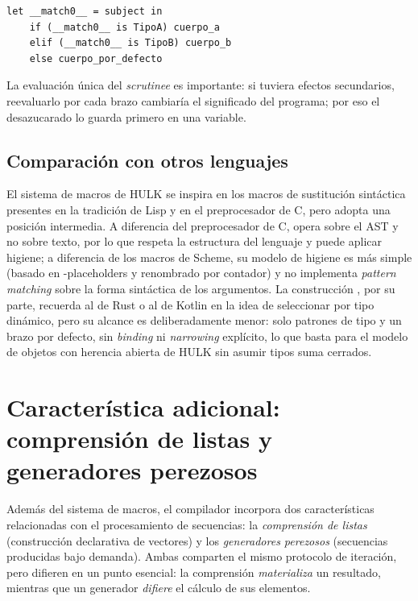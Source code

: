 \documentclass[12pt,letterpaper]{article}
\newcommand{\repo}[1]{\texttt{\detokenize{#1}}}
\newcommand{\hulk}{\textsc{HULK}}
\begin{document}
\begin{lstlisting}[language=HULK,caption={Esquema conceptual de desazucarado de match}]
let __match0__ = subject in
    if (__match0__ is TipoA) cuerpo_a
    elif (__match0__ is TipoB) cuerpo_b
    else cuerpo_por_defecto
\end{lstlisting}

La evaluación única del \emph{scrutinee} es importante: si tuviera efectos
secundarios, reevaluarlo por cada brazo cambiaría el significado del programa; por
eso el desazucarado lo guarda primero en una variable.

\subsection{Comparación con otros lenguajes}

El sistema de macros de \hulk{} se inspira en los macros de sustitución sintáctica
presentes en la tradición de Lisp y en el preprocesador de C, pero adopta una
posición intermedia. A diferencia del preprocesador de C, opera sobre el AST y no
sobre texto, por lo que respeta la estructura del lenguaje y puede aplicar higiene;
a diferencia de los macros \repo{syntax-rules} de Scheme, su modelo de higiene es
más simple (basado en \repo{$}-placeholders y renombrado por contador) y no implementa
\emph{pattern matching} sobre la forma sintáctica de los argumentos. La construcción
\repo{match}, por su parte, recuerda al \repo{match} de Rust o al \repo{when} de
Kotlin en la idea de seleccionar por tipo dinámico, pero su alcance es deliberadamente
menor: solo patrones de tipo y un brazo por defecto, sin \emph{binding} ni
\emph{narrowing} explícito, lo que basta para el modelo de objetos con herencia
abierta de \hulk{} sin asumir tipos suma cerrados.

\section{Característica adicional: comprensión de listas y generadores perezosos}

Además del sistema de macros, el compilador incorpora dos características
relacionadas con el procesamiento de secuencias: la \emph{comprensión de listas}
(construcción declarativa de vectores) y los \emph{generadores perezosos}
(secuencias producidas bajo demanda). Ambas comparten el mismo protocolo de
iteración, pero difieren en un punto esencial: la comprensión \emph{materializa}
un resultado, mientras que un generador \emph{difiere} el cálculo de sus elementos.
\end{document}
